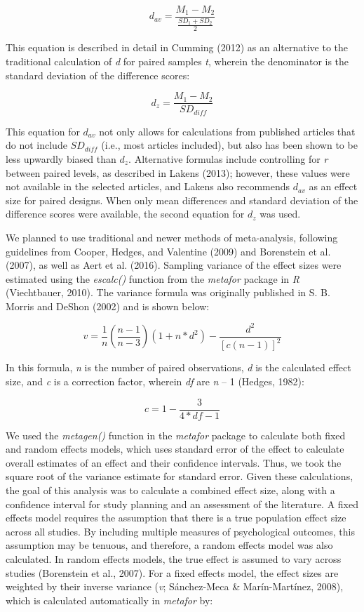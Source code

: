 \documentclass[english,man, mask]{apa6}
\theoremstyle{definition}
\theoremstyle{definition}
\theoremstyle{definition}
\theoremstyle{remark}
\begin{document}
\[
{d_{av}} = \frac { M_1 - M_2 } { \frac { SD_1 + SD_2 } { 2 }}
\]

This equation is described in detail in Cumming (2012) as an alternative
to the traditional calculation of \emph{d} for paired samples \emph{t},
wherein the denominator is the standard deviation of the difference
scores:

\[
{d_{z}} = \frac { M_1 - M_2 } { SD_{diff} }
\]

This equation for \(d_{av}\) not only allows for calculations from
published articles that do not include \(SD_{diff}\) (i.e., most
articles included), but also has been shown to be less upwardly biased
than \(d_{z}\). Alternative formulas include controlling for \emph{r}
between paired levels, as described in Lakens (2013); however, these
values were not available in the selected articles, and Lakens also
recommends \(d_{av}\) as an effect size for paired designs. When only
mean differences and standard deviation of the difference scores were
available, the second equation for \(d_z\) was used.

We planned to use traditional and newer methods of meta-analysis,
following guidelines from Cooper, Hedges, and Valentine (2009) and
Borenstein et al. (2007), as well as Aert et al. (2016). Sampling
variance of the effect sizes were estimated using the \emph{escalc()}
function from the \emph{metafor} package in \emph{R} (Viechtbauer,
2010). The variance formula was originally published in S. B. Morris and
DeShon (2002) and is shown below:

\[
v = \frac { 1 } { n } (\frac { n - 1 } { n - 3 } )(1 + n*d^2) - \frac { d^2 } { [c(n-1)]^2}
\]

In this formula, \emph{n} is the number of paired observations, \emph{d}
is the calculated effect size, and \emph{c} is a correction factor,
wherein \emph{df} are \emph{n} -- 1 (Hedges, 1982):

\[
c = 1 - \frac { 3 } { 4*df - 1 }
\]

We used the \emph{metagen()} function in the \emph{metafor} package to
calculate both fixed and random effects models, which uses standard
error of the effect to calculate overall estimates of an effect and
their confidence intervals. Thus, we took the square root of the
variance estimate for standard error. Given these calculations, the goal
of this analysis was to calculate a combined effect size, along with a
confidence interval for study planning and an assessment of the
literature. A fixed effects model requires the assumption that there is
a true population effect size across all studies. By including multiple
measures of psychological outcomes, this assumption may be tenuous, and
therefore, a random effects model was also calculated. In random effects
models, the true effect is assumed to vary across studies (Borenstein et
al., 2007). For a fixed effects model, the effect sizes are weighted by
their inverse variance (\emph{v}; Sánchez-Meca \& Marín-Martínez, 2008),
which is calculated automatically in \emph{metafor} by:
\end{document}
